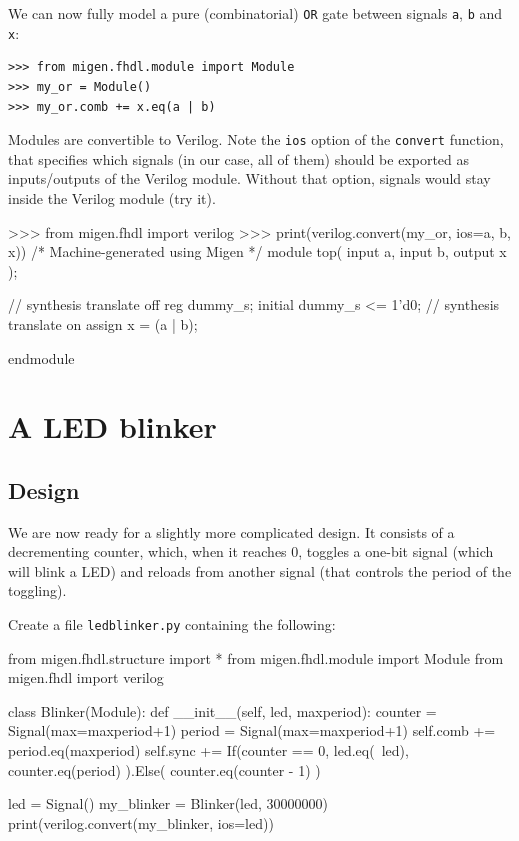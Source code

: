\documentclass[11pt]{paper}
\begin{document}

We can now fully model a pure (combinatorial) \verb!OR! gate between signals \verb!a!, \verb!b! and \verb!x!:
\begin{verbatim}
>>> from migen.fhdl.module import Module
>>> my_or = Module()
>>> my_or.comb += x.eq(a | b)
\end{verbatim}

Modules are convertible to Verilog. Note the \verb!ios! option of the \verb!convert! function, that specifies which signals (in our case, all of them) should be exported as inputs/outputs of the Verilog module. Without that option, signals would stay inside the Verilog module (try it).
\begin{verbatimtab}
>>> from migen.fhdl import verilog
>>> print(verilog.convert(my_or, ios={a, b, x}))
/* Machine-generated using Migen */
module top(
        input a,
        input b,
        output x
);


// synthesis translate off
reg dummy_s;
initial dummy_s <= 1'd0;
// synthesis translate on
assign x = (a | b);

endmodule
\end{verbatimtab}

\section{A LED blinker}
\subsection{Design}
We are now ready for a slightly more complicated design. It consists of a decrementing counter, which, when it reaches 0, toggles a one-bit signal (which will blink a LED) and reloads from another signal (that controls the period of the toggling).

Create a file \verb!ledblinker.py! containing the following:

\begin{verbatimtab}
from migen.fhdl.structure import *
from migen.fhdl.module import Module
from migen.fhdl import verilog

class Blinker(Module):
	def __init__(self, led, maxperiod):
		counter = Signal(max=maxperiod+1)
		period = Signal(max=maxperiod+1)
		self.comb += period.eq(maxperiod)
		self.sync += If(counter == 0,
				led.eq(~led),
				counter.eq(period)
			).Else(
				counter.eq(counter - 1)
			)

led = Signal()
my_blinker = Blinker(led, 30000000)
print(verilog.convert(my_blinker, ios={led}))
\end{verbatimtab}
\end{document}
